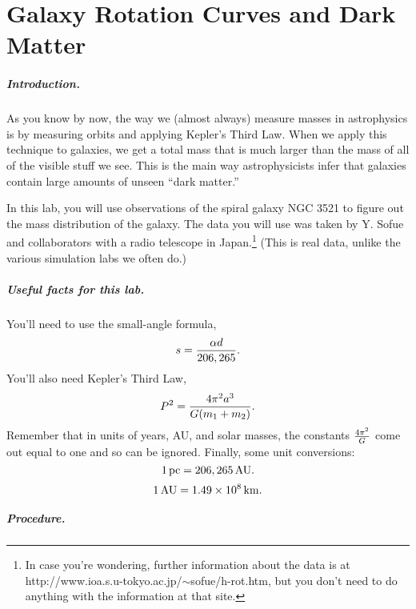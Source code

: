 \chapter{Galaxy Rotation Curves and Dark Matter}

\paragraph{Introduction.}

As you know by now, the way we (almost always) measure masses
in astrophysics is by measuring orbits and applying Kepler's Third
Law.  When we apply this technique to galaxies, we get a total
mass that is much larger than the mass of all of the visible
stuff we see.  This is the main way astrophysicists infer that
galaxies contain large amounts of unseen ``dark matter.''

In this lab, you will use observations of the spiral
galaxy NGC 3521 to figure out the mass distribution of the galaxy.
The data you will use was taken by Y. Sofue and collaborators
with a radio telescope in Japan.\footnote{In case you're
wondering, further information about the data is at
http://www.ioa.s.u-tokyo.ac.jp/$\sim$sofue/h-rot.htm,  but you don't
need to do anything with the information at that site.}
(This is real data, unlike
the various simulation labs we often do.)  

\paragraph{Useful facts for this lab.}

You'll need to use the small-angle formula,
$$
s={\alpha d\over 206,265}.
$$
You'll also need Kepler's Third Law,
$$
P^2={4\pi^2a^3\over G(m_1+m_2)}.
$$
Remember that in units of years, AU, and solar masses, the
constants $4\pi^2\over G$ come out equal to one and so can
be ignored.  Finally, some unit conversions:
$$
1\,{\rm pc}=206,265\,{\rm AU}.
$$
$$
1\,{\rm AU}=1.49\times 10^8\,{\rm km}.
$$


\paragraph{Procedure.}

